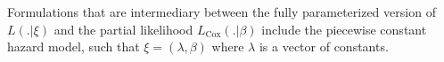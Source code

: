 \documentclass{article}
\newcommand{\nentries}{n_*}
\newcommand{\coxlik}{L_{\mathrm{Cox}}}
\newcommand{\survfulleffect}{\beta}
\newcommand{\survfullpar}{\xi}
\begin{document}
Formulations that are intermediary between the fully parameterized version of $L(.|\survfullpar)$ and the partial likelihood $\coxlik(.|\survfulleffect)$ include the piecewise constant hazard model, such that $\survfullpar=(\lambda,\survfulleffect)$ where $\lambda$ is a vector of constants.

%
%
\end{document}
